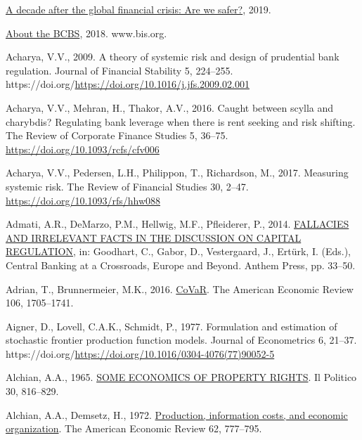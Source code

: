 \documentclass[
  letterpaper,
  DIV=11,
  numbers=noendperiod]{scrreprt}
\newlength{\cslhangindent}
\newenvironment{CSLReferences}[2] %
 {\begin{list}{}{%
  \setlength{\itemindent}{0pt}
  \setlength{\leftmargin}{0pt}
  \setlength{\parsep}{0pt}
  \ifodd #1
   \setlength{\leftmargin}{\cslhangindent}
   \setlength{\itemindent}{-1\cslhangindent}
  \fi
  \setlength{\itemsep}{#2\baselineskip}}}
 {\end{list}}
\begin{document}
\label{refs}
\begin{CSLReferences}{1}{0}
\href{https://www.imf.org/en/Publications/GFSR/Issues/2018/09/25/Global-Financial-Stability-Report-October-2018}{A
decade after the global financial crisis: Are we safer?}, 2019.

\href{https://www.bis.org/bcbs/about/overview.htm?m=85}{About the BCBS},
2018. www.bis.org.

Acharya, V.V., 2009. A theory of systemic risk and design of prudential
bank regulation. Journal of Financial Stability 5, 224--255.
https://doi.org/\url{https://doi.org/10.1016/j.jfs.2009.02.001}

Acharya, V.V., Mehran, H., Thakor, A.V., 2016. Caught between scylla and
charybdis? Regulating bank leverage when there is rent seeking and risk
shifting. The Review of Corporate Finance Studies 5, 36--75.
\url{https://doi.org/10.1093/rcfs/cfv006}

Acharya, V.V., Pedersen, L.H., Philippon, T., Richardson, M., 2017.
Measuring systemic risk. The Review of Financial Studies 30, 2--47.
\url{https://doi.org/10.1093/rfs/hhw088}

Admati, A.R., DeMarzo, P.M., Hellwig, M.F., Pfleiderer, P., 2014.
\href{http://www.jstor.org/stable/j.ctt1gxpd6m.6}{FALLACIES AND
IRRELEVANT FACTS IN THE DISCUSSION ON CAPITAL REGULATION}, in: Goodhart,
C., Gabor, D., Vestergaard, J., Ertürk, I. (Eds.), Central Banking at a
Crossroads, Europe and Beyond. Anthem Press, pp. 33--50.

Adrian, T., Brunnermeier, M.K., 2016.
\href{http://www.jstor.org/stable/43861110}{CoVaR}. The American
Economic Review 106, 1705--1741.

Aigner, D., Lovell, C.A.K., Schmidt, P., 1977. Formulation and
estimation of stochastic frontier production function models. Journal of
Econometrics 6, 21--37.
https://doi.org/\url{https://doi.org/10.1016/0304-4076(77)90052-5}

Alchian, A.A., 1965. \href{http://www.jstor.org/stable/43206327}{SOME
ECONOMICS OF PROPERTY RIGHTS}. Il Politico 30, 816--829.

Alchian, A.A., Demsetz, H., 1972.
\href{http://www.jstor.org/stable/1815199}{Production, information
costs, and economic organization}. The American Economic Review 62,
777--795.


\end{CSLReferences}
\end{document}
